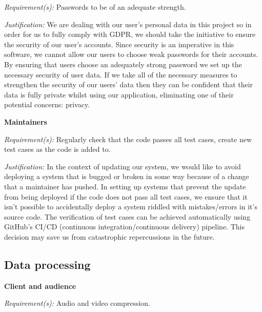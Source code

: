 \textit{Requirement(s):} Passwords to be of an adequate strength.
\\ \vspace{0.1cm}

\textit{Justification:}
We are dealing with our user's personal data in this project
so in order for us to fully comply with GDPR, we should
take the initiative to ensure the security of our user's
accounts. Since security is an imperative in this software,
we cannot allow our users to choose weak passwords
for their accounts. By ensuring that users choose an
adequately strong password we set up the necessary
security of user data. If we take all of the necessary
measures to strengthen the security of our users’ data
then they can be confident that their data is fully
private whilst using our application, eliminating
one of their potential concerns: privacy.
\\ \vspace{0.2cm}

\textsf{\bfseries Maintainers} \\ \vspace{0.1cm}

\textit{Requirement(s):} Regularly check that the code passes
all test cases, create new test cases as the code is added to.
\\ \vspace{0.1cm}

\textit{Justification:}
In the context of updating our system, we would like to avoid
deploying a system that is bugged or broken in some way
because of a change that a maintainer has pushed. In setting
up systems that prevent the update from being deployed if the
code does not pass all test cases, we ensure that it isn't
possible to accidentally deploy a system riddled with
mistakes/errors in it's source code. The verification of
test cases can be achieved automatically
using GitHub's CI/CD (continuous integration/continuous
delivery) pipeline. This decision may save us from
catastrophic repercussions in the future.

\subsection{Data processing}

\textsf{\bfseries Client and audience} \\ \vspace{0.1cm}

\textit{Requirement(s):} Audio and video compression. \\ \vspace{0.1cm}

